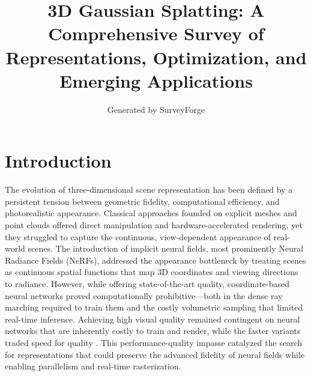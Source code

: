 \documentclass[11pt,a4paper]{article}
\title{3D Gaussian Splatting: A Comprehensive Survey of Representations, Optimization, and Emerging Applications}
\author{Generated by SurveyForge}
\date{}
\begin{document}
\maketitle
\tableofcontents
\newpage



\section{Introduction}


The evolution of three-dimensional scene representation has been defined by a persistent tension between geometric fidelity, computational efficiency, and photorealistic appearance. Classical approaches founded on explicit meshes and point clouds offered direct manipulation and hardware-accelerated rendering, yet they struggled to capture the continuous, view-dependent appearance of real-world scenes. The introduction of implicit neural fields, most prominently Neural Radiance Fields (NeRFs), addressed the appearance bottleneck by treating scenes as continuous spatial functions that map 3D coordinates and viewing directions to radiance. However, while offering state-of-the-art quality, coordinate-based neural networks proved computationally prohibitive---both in the dense ray marching required to train them and the costly volumetric sampling that limited real-time inference. Achieving high visual quality remained contingent on neural networks that are inherently costly to train and render, while the faster variants traded speed for quality \cite{arxiv:2308.04079v1}. This performance-quality impasse catalyzed the search for representations that could preserve the advanced fidelity of neural fields while enabling parallelism and real-time rasterization.
\end{document}
